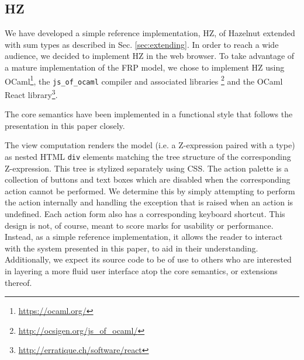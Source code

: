\subsection{HZ}
We have developed a simple reference implementation, HZ, of Hazelnut extended with sum types as described in Sec. \ref{sec:extending}.  In
order to reach a wide audience, we decided to implement HZ in the web
browser.  To take advantage of a mature implementation of the FRP
model, we chose to implement HZ using
OCaml\footnote{\url{https://ocaml.org/}}, the \texttt{js\_of\_ocaml}
compiler and associated libraries
\cite{DBLP:conf/ml/Balat06}\footnote{\url{http://ocsigen.org/js\_of\_ocaml/}}
and the OCaml React
library\footnote{\url{http://erratique.ch/software/react}}.

The core semantics have
been implemented in a functional style that follows the presentation in this paper closely.

The view computation renders the model (i.e. a Z-expression paired with a type) as nested HTML \texttt{div} elements matching the tree structure of the corresponding Z-expression. This tree is stylized separately using CSS. The action palette is a collection of buttons and text boxes which
are disabled when the corresponding action cannot be performed. We determine this by simply attempting to perform the
action internally and handling the exception that is raised when an action
is undefined. Each action form also has a corresponding keyboard shortcut. This design is not, of course, meant to score marks for
usability or performance. Instead, as a simple reference implementation, it allows the reader to interact with the system presented in this paper, to aid in their understanding.  Additionally, we expect its source code to be of use to others who are interested in
layering a more fluid user interface atop the core semantics, or extensions thereof. 
